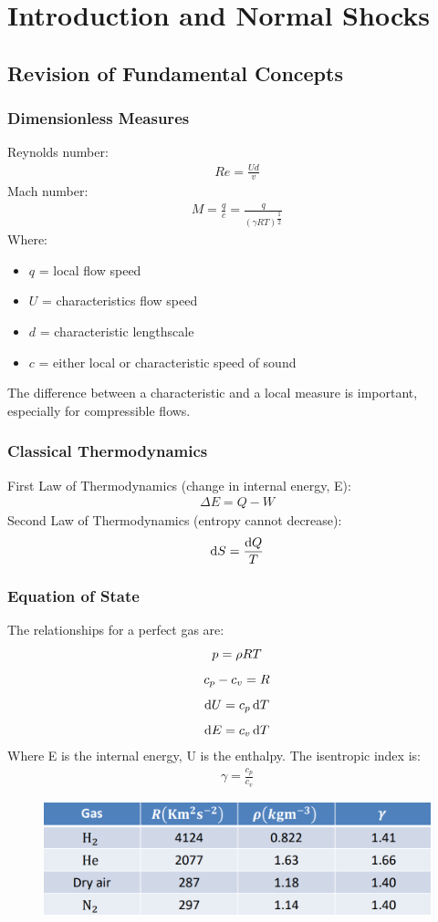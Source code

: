 \chapter{Introduction and Normal Shocks}
\section{Revision of Fundamental Concepts}
\subsection{Dimensionless Measures}
Reynolds number:
\begin{gather}
    Re = \frac{Ud}{v}
\end{gather}
Mach number:
\begin{gather}
    M = \frac{q}{c} = \frac{q}{(\gamma R T)^{\dfrac{1}{2}}}
\end{gather}
Where:
\begin{itemize}[noitemsep]
    \item $q$ = local flow speed
    \item $U$ = characteristics flow speed
    \item $d$ = characteristic lengthscale
    \item $c$ = either local or characteristic speed of sound
\end{itemize}
The difference between a characteristic and a local measure is important, especially for compressible flows.
\subsection{Classical Thermodynamics}
First Law of Thermodynamics (change in internal energy, E):
\begin{gather}
    \Delta E = Q - W
\end{gather}
Second Law of Thermodynamics (entropy cannot decrease):
\begin{gather}
    \dif S = \frac{\dif Q}{T}
\end{gather}
\subsection{Equation of State}
The relationships for a perfect gas are:
\begin{gather}
    p = \rho R T \\[5pt]
    c_p - c_v = R \\[5pt]
    \dif U = c_p \dif T \\[5pt]
    \dif E = c_v \dif T
\end{gather}
Where E is the internal energy, U is the enthalpy. The isentropic index is:
\begin{gather}
    \gamma = \frac{c_p}{c_v}
\end{gather}
\begin{figure}[H]
    \centering
    \includegraphics[width = 0.7 \textwidth]{./img/diagram1.PNG}
    \caption{}
\end{figure}
